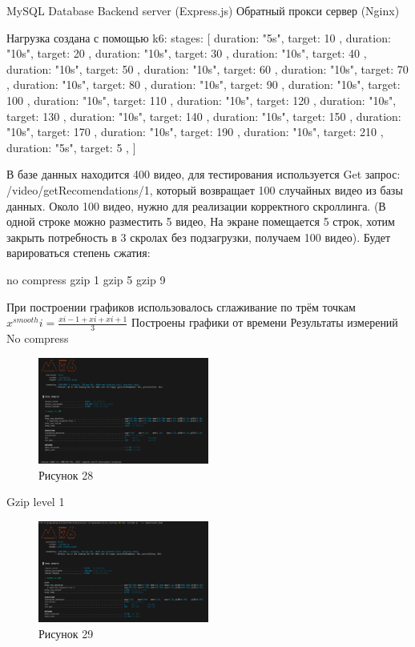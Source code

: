 \documentclass[12pt]{article}
\begin{document}
MySQL Database
Backend server (Express.js)
Обратный прокси сервер (Nginx)

Нагрузка создана с помощью k6:
  stages: [
    { duration: "5s", target: 10 },
    { duration: "10s", target: 20 },
    { duration: "10s", target: 30 },
    { duration: "10s", target: 40 },
    { duration: "10s", target: 50 },
    { duration: "10s", target: 60 },
    { duration: "10s", target: 70 },
    { duration: "10s", target: 80 },
    { duration: "10s", target: 90 },
    { duration: "10s", target: 100 },
    { duration: "10s", target: 110 },
    { duration: "10s", target: 120 },
    { duration: "10s", target: 130 },
    { duration: "10s", target: 140 },
    { duration: "10s", target: 150 },
    { duration: "10s", target: 170 },
    { duration: "10s", target: 190 },
    { duration: "10s", target: 210 },
    { duration: "5s", target: 5 },
  ]

В базе данных находится 400 видео, для тестирования используется Get запрос:
/video/getRecomendations/1, который возвращает 100 случайных видео из базы данных. Около 100 видео, нужно для реализации корректного
скроллинга. (В одной строке можно разместить 5 видео, На экране помещается 5 строк, хотим закрыть
потребность в 3 скролах без подзагрузки, получаем 100 видео). 
Будет варироваться степень сжатия:

no compress
gzip 1
gzip 5
gzip 9

При построении графиков использовалось сглаживание по трём точкам
$x^{smooth}{i} = \frac{x{i-1} + x{i} + x{i+1}}{3}$
Построены графики от времени
Результаты измерений
No compress
\begin{figure}[h!]
\centering
\includegraphics[width=0.5\textwidth]{../images/second_part/no_compress_screenshot.png}
\caption{Рисунок 28}
\end{figure}

Gzip level 1
\begin{figure}[h!]
\centering
\includegraphics[width=0.5\textwidth]{../images/second_part/gzip1_screenshot.png}
\caption{Рисунок 29}
\end{figure}
\end{document}
